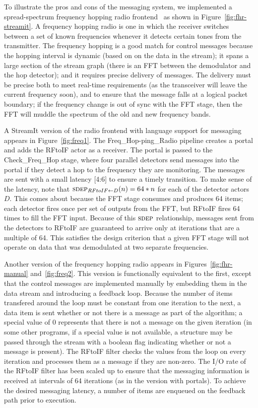 To illustrate the pros and cons of the messaging system, we
implemented a spread-spectrum frequency hopping radio
frontend~\cite{harada02} as shown in Figure~\ref{fig:fhr-streamit}.  A
frequency hopping radio is one in which the receiver switches between
a set of known frequencies whenever it detects certain tones from the
transmitter.  The frequency hopping is a good match for control
messages because the hopping interval is dynamic (based on on the data
in the stream); it spans a large section of the stream graph (there is
an FFT between the demodulator and the hop detector); and it requires
precise delivery of messages.  The delivery must be precise both to
meet real-time requirements (as the transceiver will leave the current
frequency soon), and to ensure that the message falls at a logical
packet boundary; if the frequency change is out of sync with the FFT
stage, then the FFT will muddle the spectrum of the old and new
frequency bands.

A StreamIt version of the radio frontend with language support for
messaging appears in Figure~\ref{fig:freq1}.  The
Freq\_Hop-ping\_Radio pipeline creates a portal and adds the RFtoIF
actor as a receiver.  The portal is passed to the Check\_Freq\_Hop
stage, where four parallel detectors send messages into the portal if
they detect a hop to the frequency they are monitoring.  The messages
are sent with a small latency [4:6] to ensure a timely transition.  To
make sense of the latency, note that $\sdepf{RFtoIF}{D}(n) = 64*n$ for
each of the detector actors $D$.  This comes about because the FFT
stage consumes and produces 64 items; each detector fires once per set
of outputs from the FFT, but RFtoIF fires 64 times to fill the FFT
input.  Because of this $\textsc{sdep}$ relationship, messages sent from the
detectors to RFtoIF are guaranteed to arrive only at iterations that
are a multiple of 64.  This satisfies the design criterion that a
given FFT stage will not operate on data that was demodulated at two
separate frequencies.

Another version of the frequency hopping radio appears in
Figures~\ref{fig:fhr-manual} and~\ref{fig:freq2}.  This version is
functionally equivalent to the first, except that the control messages
are implemented manually by embedding them in the data stream and
introducing a feedback loop.  Because the number of items transfered
around the loop must be constant from one iteration to the next, a
data item is sent whether or not there is a message as part of the
algorithm; a special value of 0 represents that there is not a message
on the given iteration (in some other programs, if a special value is
not available, a structure may be passed through the stream with a
boolean flag indicating whether or not a message is present).  The
RFtoIF filter checks the values from the loop on every iteration and
processes them as a message if they are non-zero.  The I/O rate of the
RFtoIF filter has been scaled up to ensure that the messaging
information is received at intervals of 64 iterations (as in the
version with portals).  To achieve the desired messaging latency, a
number of items are enqueued on the feedback path prior to execution.

